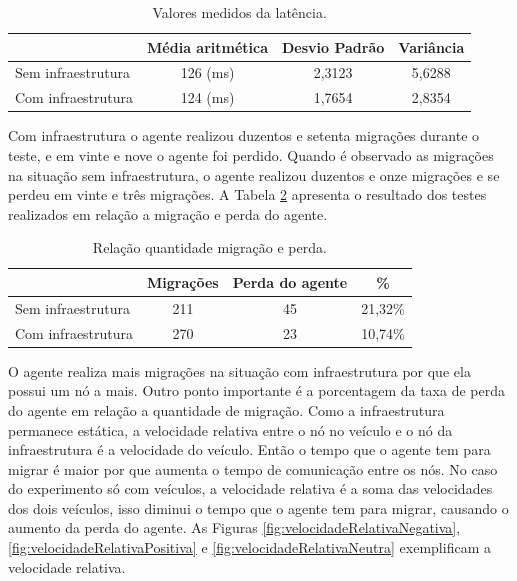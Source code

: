\begin{table}[ht]
	\caption{Valores medidos da latência.}
	\centering
	\begin{tabular}{ | l | c | c | c|}
		\hline
		& Média aritmética & Desvio Padrão & Variância \\ \hline
		Sem infraestrutura & 126 (ms) & 2,3123 & 5,6288  \\ \hline
		Com infraestrutura & 124 (ms) & 1,7654 & 2,8354 \\ \hline
	\end{tabular}
	\label{tab:experimentoRealLatencia}
\end{table}

Com infraestrutura o agente realizou duzentos e setenta migrações durante o teste, e em vinte e nove o agente foi perdido. Quando é observado as migrações na situação sem infraestrutura, o agente realizou duzentos e onze migrações e se perdeu em vinte e três migrações. A Tabela \ref{tab:migracoesPerda} apresenta o resultado dos testes realizados em relação a migração e perda do agente.

\begin{table}[ht]
	\caption{Relação quantidade migração e perda.}
	\centering
	\begin{tabular}{ | l | c | c | c |}
		\hline
					& Migrações & Perda do agente & \% \\ \hline
		Sem infraestrutura & 211 & 45 & 21,32\%  \\ \hline
		Com infraestrutura & 270 & 23 & 10,74\%  \\ \hline
	\end{tabular}
	\label{tab:migracoesPerda}
\end{table}

O agente realiza mais migrações na situação com infraestrutura por que ela possui um nó a mais. Outro ponto importante é a porcentagem da taxa de perda do agente  em relação a quantidade de migração. Como a infraestrutura permanece estática, a velocidade relativa entre o nó no veículo e o nó da infraestrutura é a velocidade do veículo. Então o tempo que o agente tem para migrar é maior por que aumenta o tempo de comunicação entre os nós. No caso do experimento só com veículos, a velocidade relativa é a soma das velocidades dos dois veículos, isso diminui o tempo que o agente tem para migrar, causando o aumento da perda do agente. As Figuras \ref{fig:velocidadeRelativaNegativa}, \ref{fig:velocidadeRelativaPositiva} e \ref{fig:velocidadeRelativaNeutra} exemplificam a velocidade relativa.


